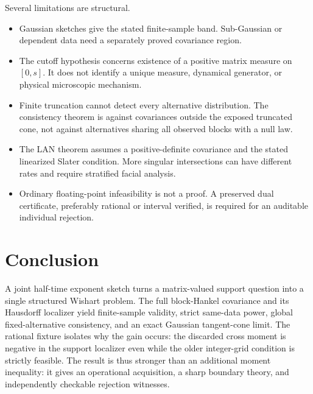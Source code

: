 \documentclass[11pt]{article}
\begin{document}
Several limitations are structural.
\begin{itemize}
 \item Gaussian sketches give the stated finite-sample band.  Sub-Gaussian or
 dependent data need a separately proved covariance region.
 \item The cutoff hypothesis concerns existence of a positive matrix measure
 on $[0,s]$.  It does not identify a unique measure, dynamical generator, or
 physical microscopic mechanism.
 \item Finite truncation cannot detect every alternative distribution.  The
 consistency theorem is against covariances outside the exposed truncated
 cone, not against alternatives sharing all observed blocks with a null law.
 \item The LAN theorem assumes a positive-definite covariance and the stated
 linearized Slater condition.  More singular intersections can have different
 rates and require stratified facial analysis.
 \item Ordinary floating-point infeasibility is not a proof.  A preserved dual
 certificate, preferably rational or interval verified, is required for an
 auditable individual rejection.
\end{itemize}

\section{Conclusion}

A joint half-time exponent sketch turns a matrix-valued support question into
a single structured Wishart problem.  The full block-Hankel covariance and
its Hausdorff localizer yield finite-sample validity, strict same-data power,
global fixed-alternative consistency, and an exact Gaussian tangent-cone
limit.  The rational fixture isolates why the gain occurs: the discarded
cross moment is negative in the support localizer even while the older
integer-grid condition is strictly feasible.  The result is thus stronger
than an additional moment inequality: it gives an operational acquisition,
a sharp boundary theory, and independently checkable rejection witnesses.

\printbibliography
\end{document}
